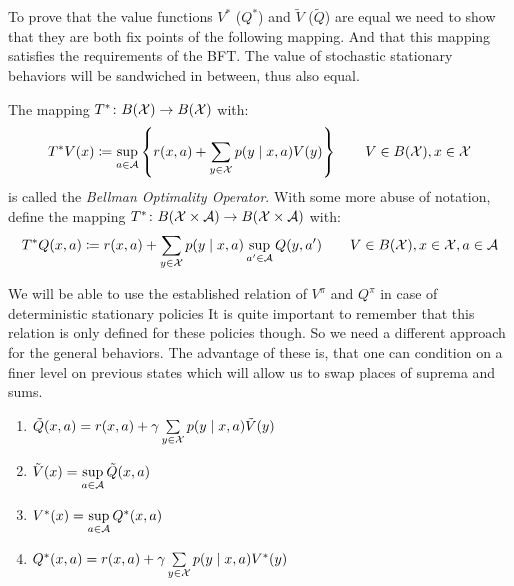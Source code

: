 To prove that the value functions \(V^*\) (\(Q^*\)) and \(\tilde{V}\) (\(\tilde{Q}\))  are equal we need to show that they are both fix points of the following mapping. 
And that this mapping satisfies the requirements of the BFT. The value of stochastic stationary behaviors will be sandwiched in between, thus also equal. 

\begin{definition}
The mapping \(T^*\colon B(\mathcal{X})\to B(\mathcal{X})\) with:
	\[
	 T^* V(x)\coloneqq \sup_{a\in\mathcal{A}}\left\{r(x,a)+\sum_{y\in\mathcal{X}}p(y\mid x,a) V(y)\right\} \qquad V\in B(\mathcal{X}), x\in\mathcal{X}
	\]
is called the \emph{Bellman Optimality Operator}. With some more abuse of notation, define the mapping \(T^*\colon B(\mathcal{X}\times\mathcal{A})\to B(\mathcal{X}\times\mathcal{A})\) with:
	\[
	T^* Q(x,a)\coloneqq r(x,a)+\sum_{y\in\mathcal{X}}p(y\mid x,a) \sup_{a'\in\mathcal{A}}Q(y,a') \qquad V\in B(\mathcal{X}), x\in\mathcal{X}, a\in\mathcal{A}
	\]
\end{definition}

We will be able to use the established relation of \(V^\pi\) and \(Q^\pi\) in case of deterministic stationary policies
It is quite important to remember that this relation is only defined for these policies though. So we need a different approach for the general behaviors. The advantage of these is, that one can condition on a finer level on previous states which will allow us to swap places of suprema and sums.


\begin{lemma}\label{V*,Q* relation}\leavevmode
\begin{enumerate}[label=(\roman*),font=\normalfont]
\item\label{i:1} \(\tilde{Q}(x,a)= r(x,a)+\gamma\sum\limits_{y\in\mathcal{X}}p(y\mid x,a)\tilde{V}(y)\)
\item\label{i:2} \(\tilde{V}(x)= \sup\limits_{a\in\mathcal{A}} \tilde{Q}(x,a)\)
\item\label{i:3} \(V^*(x)=\sup\limits_{a\in\mathcal{A}}Q^*(x,a)\)
\item\label{i:4} \(Q^*(x,a)=r(x,a)+\gamma \sum\limits_{y\in\mathcal{X}}p(y\mid x,a) V^*(y)\)
\end{enumerate}
\end{lemma}

